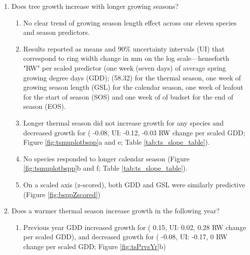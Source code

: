 \documentclass{article}\usepackage[]{graphicx}\usepackage[]{xcolor}
\begin{document}
\begin{enumerate}
\begin{enumerate}
\end{enumerate}
\item Does tree growth increase with longer growing seasons?
  \begin{enumerate}

  \item No clear trend of growing season length effect across our eleven species and season predictors. %
  \item Results reported as means and 90\% uncertainty intervals (UI) that correspond to ring width change in mm on the log scale---henseforth "RW" per scaled predictor (one week (seven days) of average spring growing degree days (GDD); (58.32) for the thermal season, one week of growing season length (GSL) for the calendar season, one week of leafout for the start of season (SOS) and one week of of budset for the end of season (EOS). %

  \item Longer thermal season did not increase growth for any species and decreased growth for {\Ball} (
  -0.08, UI:
  -0.12,
  -0.03 RW change per scaled GDD; Figure \ref{fig:tsmuplotbspp}a and e; Table \ref{tab:ts_slope_table}).
  
  \item No species responded to longer calendar season (Figure \ref{fig:tsmuplotbspp}b and f; Table \ref{tab:ts_slope_table}).

  \item On a scaled axis (z-scored), both GDD and GSL were similarly predictive (Figure \ref{fig:bsppZscored})

  \end{enumerate}

\item Does a warmer thermal season increase growth in the following year?
  \begin{enumerate}
  
  \item Previous year GDD increased growth for {\Ball} (
  0.15, UI:
  0.02,
  0.28 RW change per scaled GDD),
  and decreased growth for {\Bnig} (
  -0.08, UI:
  -0.17,
  0 RW change per scaled GDD; Figure \ref{fig:tsPrvsYr}b)
  

\end{enumerate}
\end{enumerate}
\end{document}
